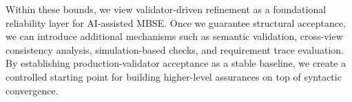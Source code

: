 \documentclass[colorlinks,upint,subscriptcorrection,varvw,hyphenate,balance]{asmeconf} %
\begin{document}
Within these bounds, we view validator-driven refinement as a foundational reliability layer for AI-assisted MBSE. Once we guarantee structural acceptance, we can introduce additional mechanisms such as semantic validation, cross-view consistency analysis, simulation-based checks, and requirement trace evaluation. By establishing production-validator acceptance as a stable baseline, we create a controlled starting point for building higher-level assurances on top of syntactic convergence.




\end{document}
